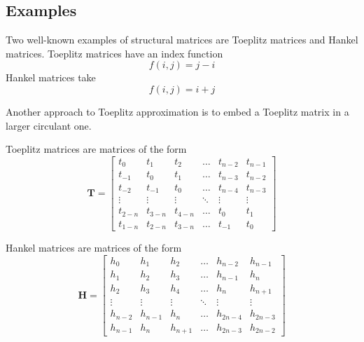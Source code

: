\documentclass[letterpaper,12pt,oneside,final]{article}
\newcommand{\m}[1]{\mathbf{#1}}               %
\begin{document}
\subsection{Examples}

Two well-known examples of structural matrices are Toeplitz matrices and Hankel matrices. Toeplitz matrices have an index function
$$f(i,j) = j - i$$
Hankel matrices take
$$f(i,j) = i + j$$

Another approach to Toeplitz approximation is to embed a Toeplitz matrix in a larger circulant one.


Toeplitz matrices are matrices of the form
\begin{equation} \label{eq:toepdefn}
  \m{T} = \begin{bmatrix}
    t_0 & t_1 & t_2 & \dots & t_{n-2} & t_{n-1} \\
    t_{-1} & t_0 & t_1 & \dots & t_{n-3} & t_{n-2} \\
    t_{-2} & t_{-1} & t_0 & \dots & t_{n-4} & t_{n-3} \\
    \vdots & \vdots & \vdots & \ddots & \vdots & \vdots \\
    t_{2-n} & t_{3-n} & t_{4-n} & \dots & t_0 & t_1 \\
    t_{1-n} & t_{2-n} & t_{3-n} & \dots & t_{-1} & t_0
  \end{bmatrix}
\end{equation}

Hankel matrices are matrices of the form
\begin{equation} \label{eq:toepdefn}
  \m{H} = \begin{bmatrix}
    h_0 & h_1 & h_2 & \dots & h_{n-2} & h_{n-1} \\
    h_1 & h_2 & h_3 & \dots & h_{n-1} & h_n \\
    h_2 & h_3 & h_4 & \dots & h_n & h_{n+1} \\
    \vdots & \vdots & \vdots & \ddots & \vdots & \vdots \\
    h_{n-2} & h_{n-1} & h_{n} & \dots & h_{2n-4} & h_{2n-3} \\
    h_{n-1} & h_{n} & h_{n+1} & \dots & h_{2n-3} & h_{2n-2}
  \end{bmatrix}
\end{equation}



\end{document}

